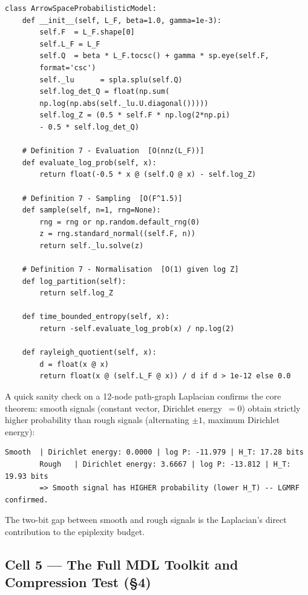 \documentclass[12pt,a4paper]{article}
\theoremstyle{plain}
\theoremstyle{definition}
\theoremstyle{remark}
\newcommand{\1}{\mathbf{1}}
\begin{document}
	\begin{lstlisting}[caption={LGMRF wrapper satisfying Definition~7},
		label={lst:lgmrfclass}]
class ArrowSpaceProbabilisticModel:
	def __init__(self, L_F, beta=1.0, gamma=1e-3):
		self.F  = L_F.shape[0]
		self.L_F = L_F
		self.Q  = beta * L_F.tocsc() + gamma * sp.eye(self.F,
		format='csc')
		self._lu      = spla.splu(self.Q)
		self.log_det_Q = float(np.sum(
		np.log(np.abs(self._lu.U.diagonal()))))
		self.log_Z = (0.5 * self.F * np.log(2*np.pi)
		- 0.5 * self.log_det_Q)
		
	# Definition 7 - Evaluation  [O(nnz(L_F))]
	def evaluate_log_prob(self, x):
		return float(-0.5 * x @ (self.Q @ x) - self.log_Z)
		
	# Definition 7 - Sampling  [O(F^1.5)]
	def sample(self, n=1, rng=None):
		rng = rng or np.random.default_rng(0)
		z = rng.standard_normal((self.F, n))
		return self._lu.solve(z)
		
	# Definition 7 - Normalisation  [O(1) given log Z]
	def log_partition(self):
		return self.log_Z
		
	def time_bounded_entropy(self, x):
		return -self.evaluate_log_prob(x) / np.log(2)
		
	def rayleigh_quotient(self, x):
		d = float(x @ x)
		return float(x @ (self.L_F @ x)) / d if d > 1e-12 else 0.0
	\end{lstlisting}
	
	A quick sanity check on a 12-node path-graph Laplacian confirms the
	core theorem: smooth signals (constant vector, Dirichlet energy~$= 0$)
	obtain strictly higher probability than rough signals (alternating
	$\pm 1$, maximum Dirichlet energy):
	
	\begin{lstlisting}[numbers=none, backgroundcolor=\color{white},
		frame=none]
		Smooth  | Dirichlet energy: 0.0000 | log P: -11.979 | H_T: 17.28 bits
		Rough   | Dirichlet energy: 3.6667 | log P: -13.812 | H_T: 19.93 bits
		=> Smooth signal has HIGHER probability (lower H_T) -- LGMRF confirmed.
	\end{lstlisting}
	
	\noindent The two-bit gap between smooth and rough signals is the
	Laplacian's direct contribution to the epiplexity budget.
	
	\subsection{Cell 5 --- The Full MDL Toolkit and Compression Test (§4)}
	
\end{document}

